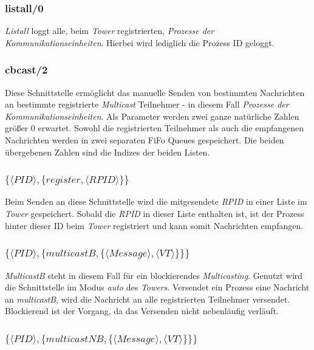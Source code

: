 \subsubsection{listall/0}

\textit{Listall} loggt alle, beim \textit{Tower} registrierten, \textit{Prozesse der Kommunikationseinheiten}. Hierbei wird lediglich die Prozess ID geloggt.

\subsubsection{cbcast/2} \label{tower_cbcast}

Diese Schnittstelle ermöglicht das manuelle Senden von bestimmten Nachrichten an bestimmte registrierte \textit{Multicast} Teilnehmer - in diesem Fall \textit{Prozesse der Kommunikationseinheiten}. Als Parameter werden zwei ganze natürliche Zahlen größer 0 erwartet. Sowohl die registrierten Teilnehmer als auch die empfangenen Nachrichten werden in zwei separaten FiFo Queues gespeichert. Die beiden übergebenen Zahlen sind die Indizes der beiden Listen. 

\subsubsection{$\{\langle PID \rangle,\{register,\langle RPID\rangle\}\}$}

Beim Senden an diese Schnittstelle wird die mitgesendete \textit{RPID} in einer Liste im \textit{Tower} gespeichert. Sobald die \textit{RPID} in dieser Liste enthalten ist, ist der Prozess hinter dieser ID beim \textit{Tower} registriert und kann  somit Nachrichten empfangen.

\subsubsection{$\{\langle PID\rangle,\{multicastB,\{\langle Message\rangle,\langle VT\rangle\}\}\}$}

\textit{MulticastB} steht in diesem Fall für ein blockierendes \textit{Multicasting}. Genutzt wird die Schnittstelle im Modus \textit{auto} des \textit{Towers}. Versendet ein Prozess eine Nachricht an \textit{multicastB}, wird die Nachricht an alle registrierten Teilnehmer versendet. Blockierend ist der Vorgang, da das Versenden nicht nebenläufig verläuft.

\subsubsection{$\{\langle PID\rangle,\{multicastNB,\{\langle Message\rangle,\langle VT\rangle\}\}\}$} 

